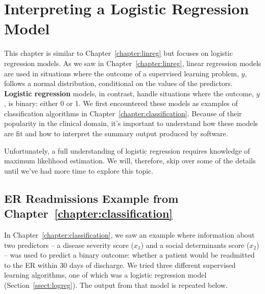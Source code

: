 \chapter{Interpreting a Logistic Regression Model \label{chapter:logreg}}

This chapter is similar to Chapter~\ref{chapter:linreg} but focuses on logistic regression models. As we saw in Chapter~\ref{chapter:linreg}, linear regression models are used in situations where the outcome of a supervised learning problem, $y$, follows a normal distribution, conditional on the values of the predictors. \textbf{Logistic regression} models, in contrast, handle situations where the outcome, $y$, is binary: either 0 or 1. We first encountered these models as examples of classification algorithms in Chapter~\ref{chapter:classification}. Because of their popularity in the clinical domain, it's important to understand how these models are fit and how to interpret the summary output produced by software. 

Unfortunately, a full understanding of logistic regression requires knowledge of maximum likelihood estimation. We will, therefore, skip over some of the details until we've had more time to explore this topic. 


\section{ER Readmissions Example from Chapter~\ref{chapter:classification}}

In Chapter~\ref{chapter:classification}, we saw an example where information about two predictors -- a disease severity score ($x_1$) and a social determinants score ($x_2$) -- was used to predict a binary outcome: whether a patient would be readmitted to the ER within 30 days of discharge. We tried three different supervised learning algorithms, one of which was a logistic regression model (Section~\ref{ssect:logreg}). The output from that model is repeated below.

